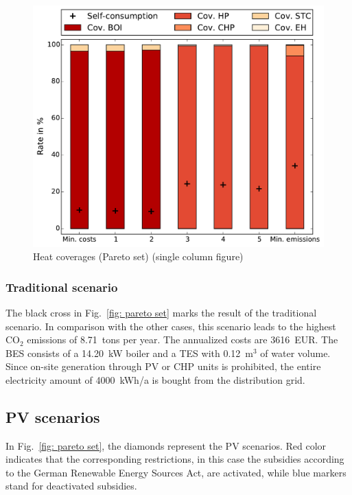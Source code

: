 \begin{figure}[h!]
	\begin{center}
		\includegraphics[width=\linewidth]{figures/plot_coverage_moo.pdf}
		\caption{Heat coverages (Pareto set) (single column figure)}
		\label{fig: heat coverage moo}
	\end{center}
\end{figure}






\subsubsection{Traditional scenario}
The black cross in Fig.~\ref{fig: pareto set} marks the result of the traditional scenario.
In comparison with the other cases, this scenario leads to the highest CO$_2$ emissions of 8.71~tons per year.
The annualized costs are 3616~EUR.
The BES consists of a 14.20~kW boiler and a TES with 0.12~m$^3$ of water volume.
Since on-site generation through PV or CHP units is prohibited, the entire electricity amount of 4000~kWh/a is bought from the distribution grid.



\subsection{PV scenarios}
In Fig.~\ref{fig: pareto set}, the diamonds represent the PV scenarios.
Red color indicates that the corresponding restrictions, in this case the subsidies according to the German Renewable Energy Sources Act, are activated, while blue markers stand for deactivated subsidies.


